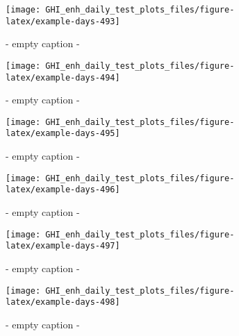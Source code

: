 \documentclass[
  10pt,
  a4paper,oneside]{article}
\begin{document}
\begin{figure}[H]

{\centering \texttt{[image: GHI\_enh\_daily\_test\_plots\_files/figure-latex/example-days-493]} 

}

\caption{ - empty caption - }\label{fig:example-days-493}
\end{figure}

\begin{figure}[H]

{\centering \texttt{[image: GHI\_enh\_daily\_test\_plots\_files/figure-latex/example-days-494]} 

}

\caption{ - empty caption - }\label{fig:example-days-494}
\end{figure}

\begin{figure}[H]

{\centering \texttt{[image: GHI\_enh\_daily\_test\_plots\_files/figure-latex/example-days-495]} 

}

\caption{ - empty caption - }\label{fig:example-days-495}
\end{figure}

\begin{figure}[H]

{\centering \texttt{[image: GHI\_enh\_daily\_test\_plots\_files/figure-latex/example-days-496]} 

}

\caption{ - empty caption - }\label{fig:example-days-496}
\end{figure}

\begin{figure}[H]

{\centering \texttt{[image: GHI\_enh\_daily\_test\_plots\_files/figure-latex/example-days-497]} 

}

\caption{ - empty caption - }\label{fig:example-days-497}
\end{figure}

\begin{figure}[H]

{\centering \texttt{[image: GHI\_enh\_daily\_test\_plots\_files/figure-latex/example-days-498]} 

}

\caption{ - empty caption - }\label{fig:example-days-498}
\end{figure}
\end{document}
